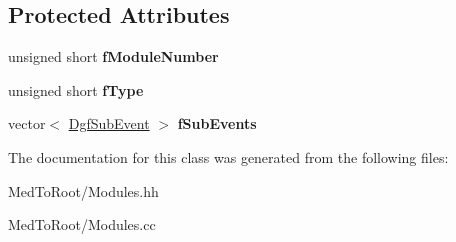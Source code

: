 \subsection*{Protected Attributes}
\begin{DoxyCompactItemize}
\item 
\mbox{\label{class_dgf_module_a06f12e7fd7e2353c454d91884fcf2bbd}} 
unsigned short {\bfseries f\+Module\+Number}
\item 
\mbox{\label{class_dgf_module_a126da76a1c1329ce3f896371d0ba7ca1}} 
unsigned short {\bfseries f\+Type}
\item 
\mbox{\label{class_dgf_module_a0f969bc0853fa696d9ecf93ad1156f27}} 
vector$<$ \hyperlink{class_dgf_sub_event}{Dgf\+Sub\+Event} $>$ {\bfseries f\+Sub\+Events}
\end{DoxyCompactItemize}


The documentation for this class was generated from the following files\+:\begin{DoxyCompactItemize}
\item 
Med\+To\+Root/Modules.\+hh\item 
Med\+To\+Root/Modules.\+cc\end{DoxyCompactItemize}
